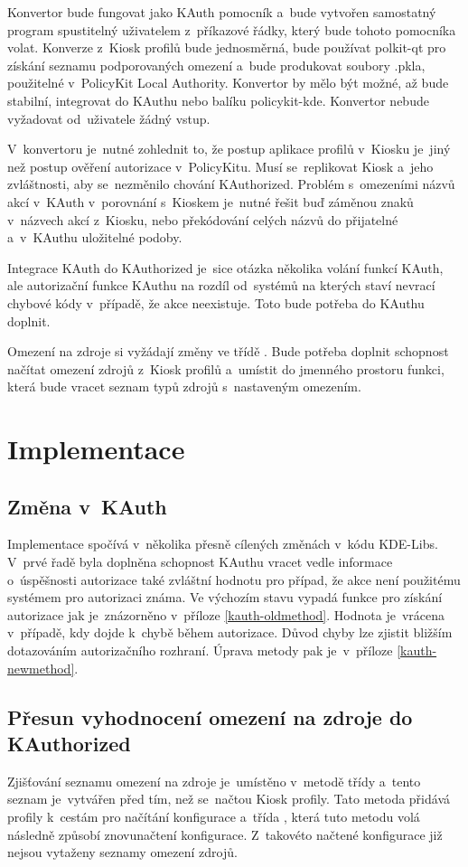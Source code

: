 Konvertor bude fungovat jako KAuth pomocník a~bude vytvořen samostatný program spustitelný uživatelem z~příkazové řádky, který bude tohoto pomocníka volat. Konverze z~Kiosk profilů bude jednosměrná, bude používat polkit-qt pro získání seznamu podporovaných omezení a~bude produkovat soubory .pkla, použitelné v~PolicyKit Local Authority. Konvertor by mělo být možné, až bude stabilní, integrovat do KAuthu nebo balíku policykit-kde. Konvertor nebude vyžadovat od~uživatele žádný vstup.

V~konvertoru je~nutné zohlednit to, že postup aplikace profilů v~Kiosku je~jiný než postup ověření autorizace v~PolicyKitu. Musí se~replikovat Kiosk a~jeho zvláštnosti, aby se~nezměnilo chování KAuthorized. Problém s~omezeními názvů akcí v~KAuth v~porovnání s~Kioskem je~nutné řešit buď záměnou znaků v~názvech akcí z~Kiosku, nebo překódování celých názvů do přijatelné a~v~KAuthu uložitelné podoby.

Integrace KAuth do KAuthorized je~sice otázka několika volání funkcí KAuth, ale autorizační funkce KAuthu na rozdíl od~systémů na kterých staví nevrací chybové kódy v~případě, že akce neexistuje. Toto bude potřeba do KAuthu doplnit.

Omezení na zdroje  si vyžádají změny ve třídě . Bude potřeba doplnit schopnost načítat omezení zdrojů z~Kiosk profilů a~umístit do jmenného prostoru  funkci, která bude vracet seznam typů zdrojů s~nastaveným omezením.

\section{Implementace}
\subsection*{Změna v~KAuth}
Implementace spočívá v~několika přesně cílených změnách v~kódu KDE-Libs. V~prvé řadě byla doplněna schopnost KAuthu vracet vedle informace o~úspěšnosti autorizace také zvláštní hodnotu pro případ, že akce není použitému systémem pro autorizaci známa. Ve výchozím stavu vypadá funkce pro získání autorizace jak je~znázorněno v~příloze \ref{kauth-oldmethod}. Hodnota  je~vrácena v~případě, kdy dojde k~chybě během autorizace. Důvod chyby lze zjistit bližším dotazováním autorizačního rozhraní. Úprava metody pak je~v~příloze \ref{kauth-newmethod}.

\subsection*{Přesun vyhodnocení omezení na zdroje do KAuthorized}
Zjišťování seznamu omezení na zdroje je~umístěno v~metodě  třídy  a~tento seznam je~vytvářen před tím, než se~načtou Kiosk profily. Tato metoda přidává profily k~cestám pro načítání konfigurace a~třída , která tuto metodu volá následně způsobí znovunačtení konfigurace. Z~takovéto načtené konfigurace již nejsou vytaženy seznamy omezení zdrojů.

